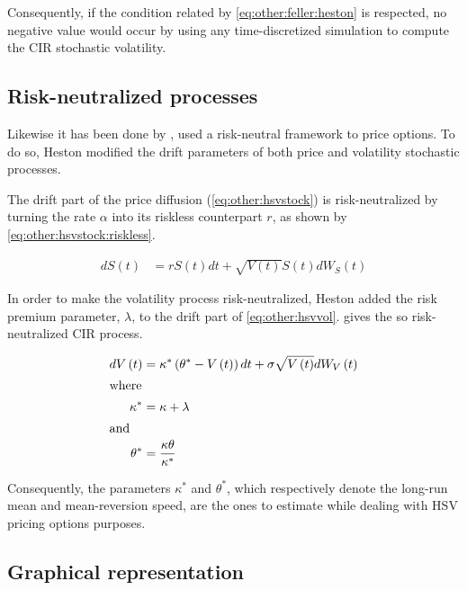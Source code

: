 \documentclass[12pt,a4paper]{report}
\newcommand{\Bmsub}[1]{W_{#1}\left(t\right)}
\newcommand{\St}{S\left(t\right)}
\newcommand{\Vt}{V\left(t\right)}
\newcommand{\HSVstockriskless}{
  d\St &= r \St dt + \sqrt{\Vt} \St d \Bmsub{S}
}
\newcommand{\HSVvolriskless}{
  d\Vt &= \kappa^{*} \left(\theta^{*} - \Vt \right) dt + \sigma \sqrt{\Vt} d \Bmsub{V}
}
\begin{document}
Consequently, if the condition related by \cref{eq:other:feller:heston} is respected, no negative value would occur by using any time-discretized simulation to compute the CIR stochastic volatility.

\subsection{Risk-neutralized processes}
\label{sub:other:heston:risk}

Likewise it has been done by \citet{bs}, \citet{heston1993} used a risk-neutral framework to price options.
To do so, Heston modified the drift parameters of both price and volatility stochastic processes.

The drift part of the price diffusion (\cref{eq:other:hsvstock}) is risk-neutralized by turning the rate $\alpha$ into its riskless counterpart $r$, as shown by \cref{eq:other:hsvstock:riskless}.

\begin{align}
    \HSVstockriskless \label{eq:other:hsvstock:riskless}
\end{align}

In order to make the volatility process risk-neutralized, Heston added the risk premium parameter, $\lambda$, to the drift part of \cref{eq:other:hsvvol}.  gives the so risk-neutralized CIR process.

\begin{align}
    \HSVvolriskless \label{eq:other:hsvvol:riskless} \\
    \intertext{where}
    \kappa^{*} & = \kappa + \lambda \label{eq:other:kappa:riskless} \\
    \intertext{and}
    \theta^{*} & = \frac{\kappa \theta}{\kappa^{*}} \label{eq:other:theta:riskless}
\end{align}

Consequently, the parameters $\kappa^{*}$ and $\theta^{*}$, which respectively denote the long-run mean and mean-reversion speed, are the ones to estimate while dealing with HSV pricing options purposes. 

\subsection{Graphical representation}
\label{sub:other:heston:graphical}   
\end{document}
